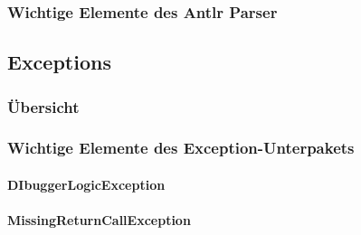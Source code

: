 \documentclass[parskip=full]{scrartcl}
\begin{document}
\subsubsection{Wichtige Elemente des Antlr Parser}

\subsection{Exceptions}
\subsubsection{Übersicht}
\subsubsection{Wichtige Elemente des Exception-Unterpakets}
\paragraph{DIbuggerLogicException}
\paragraph{MissingReturnCallException}
\end{document}
